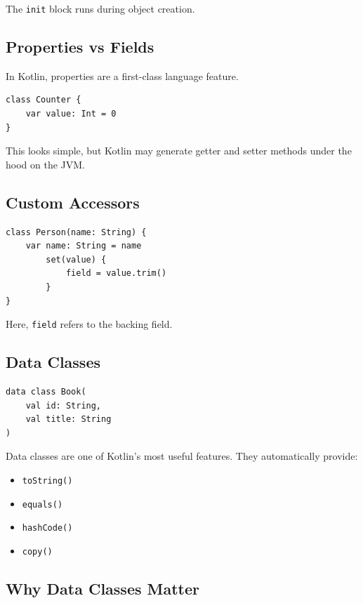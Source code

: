 \documentclass[11pt,a4paper]{article}
\begin{document}
The \texttt{init} block runs during object creation.

\subsection{Properties vs Fields}

In Kotlin, properties are a first-class language feature.

\begin{lstlisting}[style=kazekotlin]
class Counter {
    var value: Int = 0
}
\end{lstlisting}

This looks simple, but Kotlin may generate getter and setter methods under the hood on the JVM.

\subsection{Custom Accessors}

\begin{lstlisting}[style=kazekotlin]
class Person(name: String) {
    var name: String = name
        set(value) {
            field = value.trim()
        }
}
\end{lstlisting}

Here, \texttt{field} refers to the backing field.

\subsection{Data Classes}

\begin{lstlisting}[style=kazekotlin]
data class Book(
    val id: String,
    val title: String
)
\end{lstlisting}

Data classes are one of Kotlin's most useful features. They automatically provide:
\begin{itemize}
    \item \texttt{toString()}
    \item \texttt{equals()}
    \item \texttt{hashCode()}
    \item \texttt{copy()}
\end{itemize}

\subsection{Why Data Classes Matter}
\end{document}
